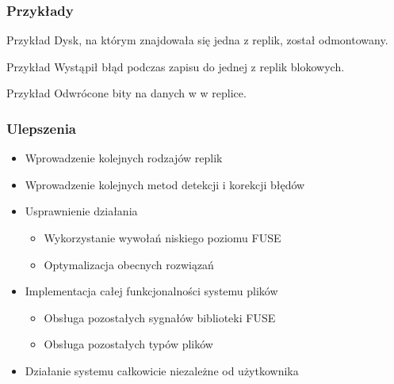 \documentclass{beamer}
\begin{document}
	\begin{frame}
		\frametitle{Przykłady}
		\begin{block}{Przykład}
			Dysk, na którym znajdowała się jedna z replik, został odmontowany. 
		\end{block}
		\pause
		\begin{block}{Przykład}
			Wystąpił błąd podczas zapisu do jednej z replik blokowych.
		\end{block}
		\pause
		\begin{block}{Przykład}
			Odwrócone bity na danych w w replice.
		\end{block}
	\end{frame}
	

	\begin{frame}
		\frametitle{Ulepszenia}
		\begin{itemize}
			\item Wprowadzenie kolejnych rodzajów replik
            \item Wprowadzenie kolejnych metod detekcji i korekcji błędów
			\item Usprawnienie działania
			\begin{itemize}
				\item Wykorzystanie wywołań niskiego poziomu FUSE
				\item Optymalizacja obecnych rozwiązań 
			\end{itemize}
			\item Implementacja całej funkcjonalności systemu plików
                    \begin{itemize}
                        \item Obsługa pozostałych sygnałów biblioteki FUSE
                        \item Obsługa pozostałych typów plików
                    \end{itemize}
			\item Działanie systemu całkowicie niezależne od użytkownika
		\end{itemize}
	\end{frame}
\end{document}
